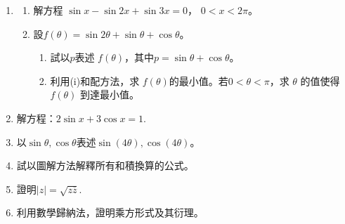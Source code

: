 \documentclass[12pt]{article}
\begin{document}
\begin{enumerate}
\begin{enumerate}
        \end{enumerate}
        \item \begin{enumerate}
            \item 解方程 $\sin{x}-\sin{2x}+\sin{3x}=0$， $0<x<2\pi$。
            \item 設$f(\theta)=\sin{2\theta}+\sin{\theta}+\cos{\theta}$。\begin{enumerate}
                \item 試以$p$表述 $f(\theta)$，其中$p=\sin{\theta}+\cos{\theta}$。
                \item 利用(i)和配方法，求 $f(\theta)$的最小值。若$0<\theta<\pi$，求 $\theta$ 的值使得 $f(\theta)$ 到達最小值。
            \end{enumerate}
        \end{enumerate}
        \item 解方程：$2\sin{x}+3\cos{x}=1$.
        \item 以$\sin{\theta},\cos{\theta}$表述$\sin(4\theta),\cos(4\theta)$。
        \item 試以圖解方法解釋所有和積換算的公式。
        \item 證明$|z|=\sqrt{z\overline{z}}$.
        \item 利用數學歸納法，證明乘方形式及其衍理。
    \end{enumerate}
\end{document}
